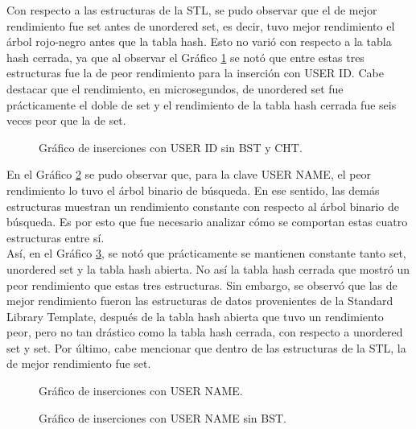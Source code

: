 \begin{multicols}{2}
Con respecto a las estructuras de la STL, se pudo observar que el de mejor rendimiento fue set antes de unordered set, es decir, tuvo mejor rendimiento el árbol rojo-negro antes que la tabla hash. Esto no varió con respecto a la tabla hash cerrada, ya que al observar el Gráfico \ref{fig:inserciones_user_id_sin_BST_CHT} se notó que entre estas tres estructuras fue la de peor rendimiento para la inserción con USER ID. Cabe destacar que el rendimiento, en microsegundos, de unordered set fue prácticamente el doble de set y el rendimiento de la tabla hash cerrada fue seis veces peor que la de set.
\begin{figure}[H]
    \centering
    
    \caption{Gráfico de inserciones con USER ID sin BST y CHT.}
    \label{fig:inserciones_user_id_sin_BST_CHT}
\end{figure}
En el Gráfico \ref{fig:inserciones_user_name} se pudo observar que, para la clave USER NAME, el peor rendimiento lo tuvo el árbol binario de búsqueda. En ese sentido, las demás estructuras muestran un rendimiento constante con respecto al árbol binario de búsqueda. Es por esto que fue necesario analizar cómo se comportan estas cuatro estructuras entre sí.\\ Así, en el Gráfico \ref{fig:inserciones_user_name_sin_BST}, se notó que prácticamente se mantienen constante tanto set, unordered set y la tabla hash abierta. No así la tabla hash cerrada que mostró un peor rendimiento que estas tres estructuras. Sin embargo, se observó que las de mejor rendimiento fueron las estructuras de datos provenientes de la Standard Library Template, después de la tabla hash abierta que tuvo un rendimiento peor, pero no tan drástico como la tabla hash cerrada, con respecto a unordered set y set. Por último, cabe mencionar que dentro de las estructuras de la STL, la de mejor rendimiento fue set.
\begin{figure}[H]
    \centering
    
    \caption{Gráfico de inserciones con USER NAME.}
    \label{fig:inserciones_user_name}
\end{figure}


\begin{figure}[H]
    \centering
    
    \caption{Gráfico de inserciones con USER NAME sin BST.}
    \label{fig:inserciones_user_name_sin_BST}
\end{figure}


\end{multicols}
